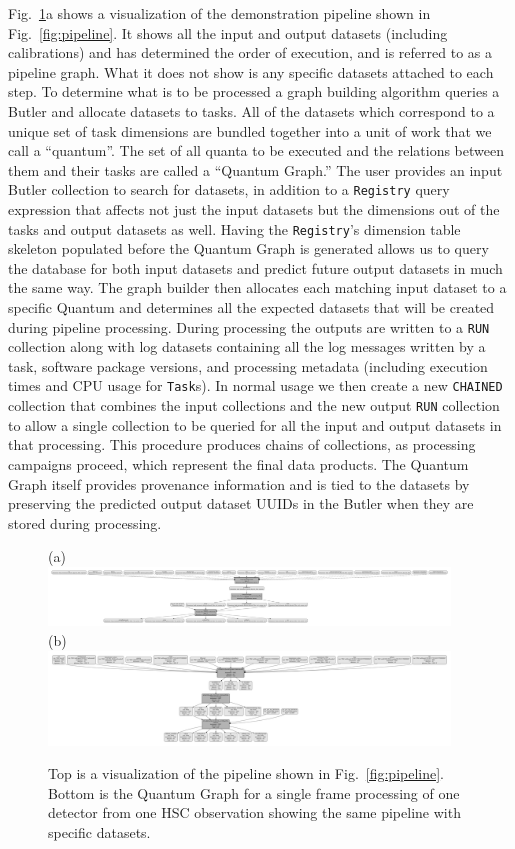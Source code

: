 \documentclass[]{spie}
\begin{document}
Fig.~\ref{fig:graph}a shows a visualization of the demonstration pipeline shown in Fig.~\ref{fig:pipeline}.
It shows all the input and output datasets (including calibrations) and has determined the order of execution, and is referred to as a pipeline graph.
What it does not show is any specific datasets attached to each step.
To determine what is to be processed a graph building algorithm queries a Butler and allocate datasets to tasks.
All of the datasets which correspond to a unique set of task dimensions are bundled together into a unit of work that we call a ``quantum''.
The set of all quanta to be executed and the relations between them and their tasks are called a ``Quantum Graph.''
The user provides an input Butler collection to search for datasets, in addition to a \texttt{Registry} query expression that affects not just the input datasets but the dimensions out of the tasks and output datasets as well.
Having the \texttt{Registry}'s dimension table skeleton populated before the Quantum Graph is generated allows us to query the database for both input datasets and predict future output datasets in much the same way.
The graph builder then allocates each matching input dataset to a specific Quantum and determines all the expected datasets that will be created during pipeline processing.
During processing the outputs are written to a \texttt{RUN} collection along with log datasets containing all the log messages written by a task, software package versions, and processing metadata (including execution times and CPU usage for \texttt{Task}s).
In normal usage we then create a new \texttt{CHAINED} collection that combines the input collections and the new output \texttt{RUN} collection to allow a single collection to be queried for all the input and output datasets in that processing.
This procedure produces chains of collections, as processing campaigns proceed, which represent the final data products.
The Quantum Graph itself provides provenance information and is tied to the datasets by preserving the predicted output dataset UUIDs in the Butler when they are stored during processing.

\begin{figure}
  (a) \includegraphics[width=0.95\textwidth]{pipeline}
  (b) \includegraphics[width=0.95\textwidth]{quantum-graph}
  \caption{Top is a visualization of the pipeline shown in Fig.~\ref{fig:pipeline}. Bottom is the Quantum Graph for a single frame processing of one detector from one HSC observation showing the same pipeline with specific datasets.}
  \label{fig:graph}
  \end{figure}
\end{document}
